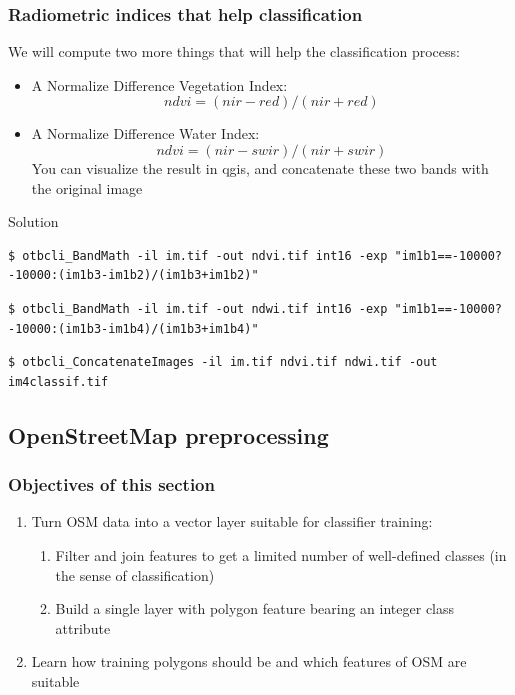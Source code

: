 \documentclass[8pt]{beamer}
\begin{document}
\begin{frame}[fragile]
\frametitle{Radiometric indices that help classification}

We will compute two more things that will help the classification process:
\begin{itemize}
\item A Normalize Difference Vegetation Index:
\begin{equation}
ndvi = (nir-red)/(nir+red)
\end{equation}
\item A Normalize Difference Water Index:
\begin{equation}
ndvi = (nir-swir)/(nir+swir)
\end{equation}
You can visualize the result in qgis, and concatenate these two bands with the original image
\end{itemize}

\begin{block}{Solution}
\begin{scriptsize}
\begin{verbatim}
$ otbcli_BandMath -il im.tif -out ndvi.tif int16 -exp "im1b1==-10000?-10000:(im1b3-im1b2)/(im1b3+im1b2)"
\end{verbatim}
\end{scriptsize}
\begin{scriptsize}
\begin{verbatim}
$ otbcli_BandMath -il im.tif -out ndwi.tif int16 -exp "im1b1==-10000?-10000:(im1b3-im1b4)/(im1b3+im1b4)"
\end{verbatim}
\end{scriptsize}
\begin{scriptsize}
\begin{verbatim}
$ otbcli_ConcatenateImages -il im.tif ndvi.tif ndwi.tif -out im4classif.tif
\end{verbatim}
\end{scriptsize}
\end{block}
\end{frame}

\subsection{OpenStreetMap preprocessing}

\begin{frame}
\frametitle{Objectives of this section}

\begin{enumerate}
\item Turn OSM data into a vector layer suitable for classifier training:
\begin{enumerate}
\item Filter and join features to get a limited number of well-defined classes (in the sense of classification)
\item Build a single layer with polygon feature bearing an integer class attribute
\end{enumerate}
\item Learn how training polygons should be and which features of OSM are suitable
\end{enumerate}

\end{frame}
\end{document}
